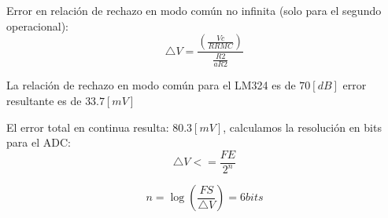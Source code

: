 \documentclass[12pt]{article}
\begin{document}
	Error en relación de rechazo en modo común no infinita (solo para el segundo operacional):
	\begin{equation}
		\bigtriangleup V = \frac{(\frac{Vc}{RRMC})}{\frac{R2}{aR2}}
	\end{equation}
	
	La relación de rechazo en modo común para el LM324 es de $70[dB]$ error resultante es de $33.7[mV]$ 
	
	El error total en continua resulta: $80.3[mV]$, calculamos la resolución en bits para el ADC:
	\begin{equation}
		\bigtriangleup V <= \frac{FE}{2^n}
	\end{equation}
	
	\begin{equation}
		n = \log(\frac{FS}{\bigtriangleup V}) = 6bits
	\end{equation}
	
\end{document}
